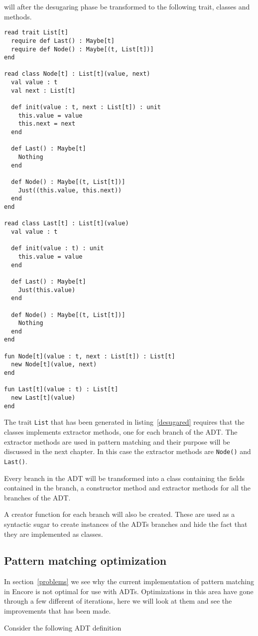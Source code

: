 \documentclass[10pt]{report}
\def\code#1{\texttt{#1}} %
\begin{document}
{\par{will after the desugaring phase be transformed to the following trait, classes and methods.}

\begin{lstlisting}[language=encore,caption={Desugared linked list},label=desugared]
read trait List[t]
  require def Last() : Maybe[t]
  require def Node() : Maybe[(t, List[t])]
end

read class Node[t] : List[t](value, next)
  val value : t
  val next : List[t]

  def init(value : t, next : List[t]) : unit
    this.value = value
    this.next = next
  end

  def Last() : Maybe[t]
    Nothing
  end

  def Node() : Maybe[(t, List[t])]
    Just((this.value, this.next))
  end
end

read class Last[t] : List[t](value)
  val value : t

  def init(value : t) : unit
    this.value = value
  end

  def Last() : Maybe[t]
    Just(this.value)
  end

  def Node() : Maybe[(t, List[t])]
    Nothing
  end
end

fun Node[t](value : t, next : List[t]) : List[t]
  new Node[t](value, next)
end

fun Last[t](value : t) : List[t]
  new Last[t](value)
end

\end{lstlisting}

\par{The trait \code{List} that has been generated in listing~\ref{desugared} requires that the classes implements extractor methods, one for each branch of the ADT\@. The extractor methods are used in pattern matching and their purpose will be discussed in the next chapter. In this case the extractor methods are \code{Node()} and \code{Last()}.}

\par{Every branch in the ADT will be transformed into a class containing the fields contained in the branch, a constructor method and extractor methods for all the branches of the ADT.}

\par{A creator function for each branch will also be created. These are used as a syntactic sugar to create instances of the ADTs branches and hide the fact that they are implemented as classes.}

\subsection{Pattern matching optimization}
\label{ch:optimization}
\par{In section~\ref{problems} we see why the current implementation of pattern matching in Encore is not optimal for use with ADTs. Optimizations in this area have gone through a few different of iterations, here we will look at them and see the improvements that has been made.}
\par{Consider the following ADT definition}

}
\end{document}
